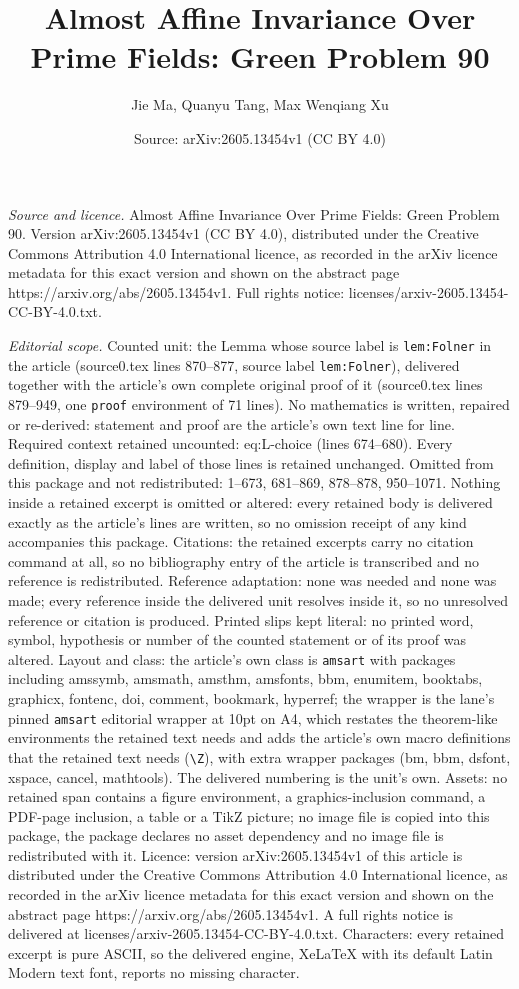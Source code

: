 \documentclass[10pt,a4paper]{amsart}
\title[Almost Affine Invariance Over Prime Fields: Green Problem 90]{Almost Affine Invariance Over Prime Fields: Green Problem 90}
\author{Jie Ma, Quanyu Tang, Max Wenqiang Xu}
\date{Source: arXiv:2605.13454v1 (CC BY 4.0)}
\begin{document}
\maketitle

\noindent\emph{Source and licence.} Almost Affine Invariance Over Prime Fields: Green Problem 90. Version arXiv:2605.13454v1 (CC BY 4.0), distributed under the Creative Commons Attribution 4.0 International licence, as recorded in the arXiv licence metadata for this exact version and shown on the abstract page https://arxiv.org/abs/2605.13454v1. Full rights notice: licenses/arxiv-2605.13454-CC-BY-4.0.txt.\par\smallskip

\noindent\textit{Editorial scope.} Counted unit: the Lemma whose source label is \texttt{lem:Folner} in the article (source0.tex lines 870--877, source label \texttt{lem:Folner}), delivered together with the article's own complete original proof of it (source0.tex lines 879--949, one \texttt{proof} environment of 71 lines). No mathematics is written, repaired or re-derived: statement and proof are the article's own text line for line. Required context retained uncounted: eq:L-choice (lines 674--680). Every definition, display and label of those lines is retained unchanged. Omitted from this package and not redistributed: 1--673, 681--869, 878--878, 950--1071. Nothing inside a retained excerpt is omitted or altered: every retained body is delivered exactly as the article's lines are written, so no omission receipt of any kind accompanies this package. Citations: the retained excerpts carry no citation command at all, so no bibliography entry of the article is transcribed and no reference is redistributed. Reference adaptation: none was needed and none was made; every reference inside the delivered unit resolves inside it, so no unresolved reference or citation is produced. Printed slips kept literal: no printed word, symbol, hypothesis or number of the counted statement or of its proof was altered. Layout and class: the article's own class is \texttt{amsart} with packages including amssymb, amsmath, amsthm, amsfonts, bbm, enumitem, booktabs, graphicx, fontenc, doi, comment, bookmark, hyperref; the wrapper is the lane's pinned \texttt{amsart} editorial wrapper at 10pt on A4, which restates the theorem-like environments the retained text needs and adds the article's own macro definitions that the retained text needs (\texttt{\textbackslash Z}), with extra wrapper packages (bm, bbm, dsfont, xspace, cancel, mathtools). The delivered numbering is the unit's own. Assets: no retained span contains a figure environment, a graphics-inclusion command, a PDF-page inclusion, a table or a TikZ picture; no image file is copied into this package, the package declares no asset dependency and no image file is redistributed with it. Licence: version arXiv:2605.13454v1 of this article is distributed under the Creative Commons Attribution 4.0 International licence, as recorded in the arXiv licence metadata for this exact version and shown on the abstract page https://arxiv.org/abs/2605.13454v1. A full rights notice is delivered at licenses/arxiv-2605.13454-CC-BY-4.0.txt. Characters: every retained excerpt is pure ASCII, so the delivered engine, XeLaTeX with its default Latin Modern text font, reports no missing character.
\end{document}
